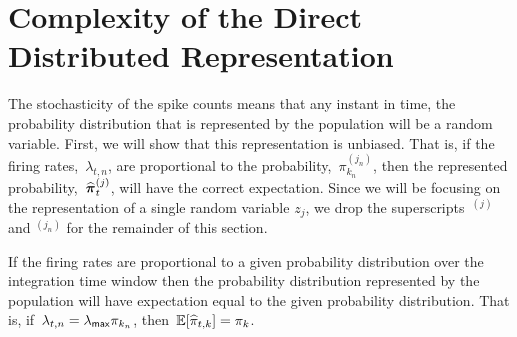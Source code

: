 \section{Complexity of the Direct Distributed Representation}
\label{sec:complexity}
The stochasticity of the spike counts means that any instant in time,
the probability distribution that is represented by the population
will be a random variable.  First, we will show that this
representation is unbiased. That is, if the firing rates,~$\lambda_{t,
  n}$, are proportional to the probability,~$\pi_{k_n}^{(j_n)}$, then
the represented probability,~$\widehat{\boldsymbol{\pi}}_{t}^{(j)}$, will have the
correct expectation.  Since we will be focusing on the representation
of a single random variable $z_j$, we drop the superscripts~${}^{(j)}$
and ${}^{(j_n)}$ for the remainder of this section.

\begin{lemma}
\label{lem:consistency}
If the firing rates are proportional to a given probability
distribution over the integration time window then the probability
distribution represented by the population will have expectation equal
to the given probability distribution.  That is,
if~$\lambda_{t, n}=\lambda_{\mathsf{max}} \pi_{k_n}$,
then~$\mathbb{E}[\widehat{\pi}_{t,k}] = \pi_{k}$.
\end{lemma}

